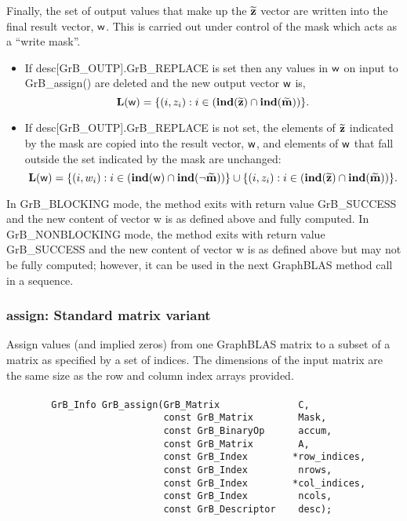 Finally, the set of output values that make up the ${\bf \widetilde{z}}$ 
vector are written into the final result vector, ${\sf w}$. 
This is carried out under control of the mask which acts as a ``write mask''.
\begin{itemize}
\item If {\sf desc[GrB\_OUTP].GrB\_REPLACE} is set then any values in ${\sf w}$ 
on input to {\sf GrB\_assign()} are deleted and the new output vector ${\sf w}$ is,
\[ \bold{L}({\sf w}) = \{(i,z_{i}) : i \in (\bold{ind}({\bf \widetilde{z}}) 
\cap \bold{ind}({\bf \widetilde{m}})) \}. \]

\item If {\sf desc[GrB\_OUTP].GrB\_REPLACE} is not set, the elements of 
${\bf \widetilde{z}}$ indicated by 
the mask are copied into the result vector, ${\sf w}$, and elements of 
${\sf w}$ that fall outside the set indicated by the mask are unchanged:
\[ \bold{L}({\sf w}) = \{(i,w_{i}) : i \in (\bold{ind}({\bf \sf w}) 
\cap \bold{ind}(\neg {\bf \widetilde{m}})) \} \cup \{(i,z_{i}) : i \in 
(\bold{ind}({\bf \widetilde{z}}) \cap \bold{ind}({\bf \widetilde{m}})) \}. \]
\end{itemize}

In {\sf GrB\_BLOCKING} mode, the method exits with return value 
{\sf GrB\_SUCCESS} and the new content of vector {\sf w} is as defined above
and fully computed.  
In {\sf GrB\_NONBLOCKING} mode, the method exits with return value 
{\sf GrB\_SUCCESS} and the new content of vector {\sf w} is as defined above 
but may not be fully computed; however, it can be used in the next GraphBLAS 
method call in a sequence.


\subsubsection{{\sf assign}: Standard matrix variant}

Assign values (and implied zeros) from one GraphBLAS matrix to a subset of a 
matrix as specified by a set of indices. The dimensions of the input matrix are
the same size as the row and column index arrays provided.

\paragraph{\syntax}

\begin{verbatim}
        GrB_Info GrB_assign(GrB_Matrix              C,
                            const GrB_Matrix        Mask,
                            const GrB_BinaryOp      accum,
                            const GrB_Matrix        A,
                            const GrB_Index        *row_indices,
                            const GrB_Index         nrows,
                            const GrB_Index        *col_indices,
                            const GrB_Index         ncols,
                            const GrB_Descriptor    desc);
\end{verbatim}

